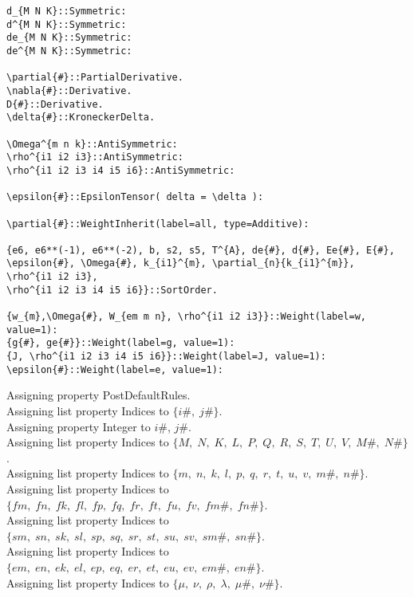\documentclass[11pt]{article}
\begin{document}
{\begin{verbatim}
d_{M N K}::Symmetric:
d^{M N K}::Symmetric:
de_{M N K}::Symmetric:
de^{M N K}::Symmetric:

\partial{#}::PartialDerivative.
\nabla{#}::Derivative.
D{#}::Derivative.
\delta{#}::KroneckerDelta.

\Omega^{m n k}::AntiSymmetric:
\rho^{i1 i2 i3}::AntiSymmetric:
\rho^{i1 i2 i3 i4 i5 i6}::AntiSymmetric:

\epsilon{#}::EpsilonTensor( delta = \delta ):

\partial{#}::WeightInherit(label=all, type=Additive):

{e6, e6**(-1), e6**(-2), b, s2, s5, T^{A}, de{#}, d{#}, Ee{#}, E{#}, \epsilon{#}, \Omega{#}, k_{i1}^{m}, \partial_{n}{k_{i1}^{m}},  \rho^{i1 i2 i3},
\rho^{i1 i2 i3 i4 i5 i6}}::SortOrder.

{w_{m},\Omega{#}, W_{em m n}, \rho^{i1 i2 i3}}::Weight(label=w, value=1):
{g{#}, ge{#}}::Weight(label=g, value=1):
{J, \rho^{i1 i2 i3 i4 i5 i6}}::Weight(label=J, value=1):
\epsilon{#}::Weight(label=e, value=1):
\end{verbatim}}
Assigning property PostDefaultRules.
\\
Assigning list property Indices to $\{i\#,\; j\#\}$.
\\
Assigning property Integer to $i\#$, $j\#$.
\\
Assigning list property Indices to $\{M,\; N,\; K,\; L,\; P,\; Q,\; R,\; S,\; T,\; U,\; V,\; M\#,\; N\#\}$.
\\
Assigning list property Indices to $\{m,\; n,\; k,\; l,\; p,\; q,\; r,\; t,\; u,\; v,\; m\#,\; n\#\}$.
\\
Assigning list property Indices to $\{fm,\; fn,\; fk,\; fl,\; fp,\; fq,\; fr,\; ft,\; fu,\; fv,\; fm\#,\; fn\#\}$.
\\
Assigning list property Indices to $\{sm,\; sn,\; sk,\; sl,\; sp,\; sq,\; sr,\; st,\; su,\; sv,\; sm\#,\; sn\#\}$.
\\
Assigning list property Indices to $\{em,\; en,\; ek,\; el,\; ep,\; eq,\; er,\; et,\; eu,\; ev,\; em\#,\; en\#\}$.
\\
Assigning list property Indices to $\{\mu,\; \nu,\; \rho,\; \lambda,\; \mu\#,\; \nu\#\}$.
\\
\end{document}
